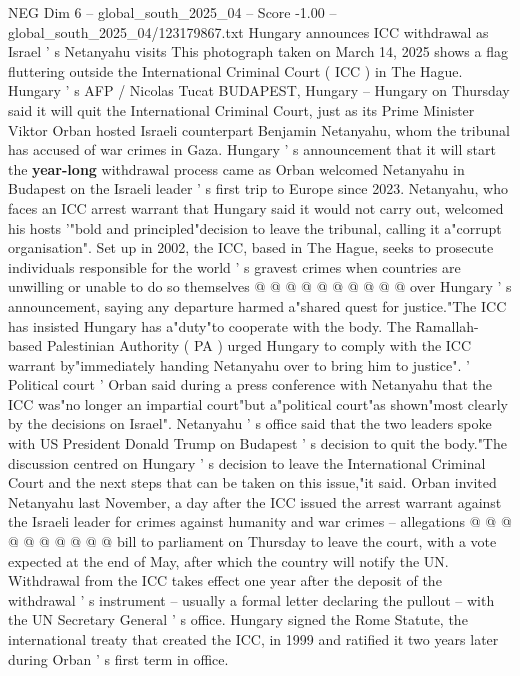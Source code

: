 \begin{textsample}{NEG Dim 6 – global\_south\_2025\_04 – Score -1.00 – global\_south\_2025\_04/123179867.txt}  \label{ex:f6_neg_206}
Hungary announces ICC withdrawal as Israel ' s Netanyahu visits This photograph taken on March 14, 2025 shows a flag fluttering outside the International Criminal Court ( ICC ) in The Hague.
Hungary ' s AFP / Nicolas Tucat BUDAPEST, Hungary -- Hungary on Thursday said it will quit the International Criminal Court, just as its Prime Minister Viktor Orban hosted Israeli counterpart Benjamin Netanyahu, whom the tribunal has accused of war crimes in Gaza.
Hungary ' s announcement that it will start the \textbf{year-long} withdrawal process came as Orban welcomed Netanyahu in Budapest on the Israeli leader ' s first trip to Europe since 2023.
Netanyahu, who faces an ICC arrest warrant that Hungary said it would not carry out, welcomed his hosts '"bold and principled"decision to leave the tribunal, calling it a"corrupt organisation".
Set up in 2002, the ICC, based in The Hague, seeks to prosecute individuals responsible for the world ' s gravest crimes when countries are unwilling or unable to do so themselves @ @ @ @ @ @ @ @ @ @ over Hungary ' s announcement, saying any departure harmed a"shared quest for justice."The ICC has insisted Hungary has a"duty"to cooperate with the body.
The Ramallah-based Palestinian Authority ( PA ) urged Hungary to comply with the ICC warrant by"immediately handing Netanyahu over to bring him to justice". ' Political court ' Orban said during a press conference with Netanyahu that the ICC was"no longer an impartial court"but a"political court"as shown"most clearly by the decisions on Israel".
Netanyahu ' s office said that the two leaders spoke with US President Donald Trump on Budapest ' s decision to quit the body."The discussion centred on Hungary ' s decision to leave the International Criminal Court and the next steps that can be taken on this issue,"it said.
Orban invited Netanyahu last November, a day after the ICC issued the arrest warrant against the Israeli leader for crimes against humanity and war crimes -- allegations @ @ @ @ @ @ @ @ @ @ bill to parliament on Thursday to leave the court, with a vote expected at the end of May, after which the country will notify the UN.
Withdrawal from the ICC takes effect one year after the deposit of the withdrawal ' s instrument -- usually a formal letter declaring the pullout -- with the UN Secretary General ' s office.
Hungary signed the Rome Statute, the international treaty that created the ICC, in 1999 and ratified it two years later during Orban ' s first term in office.

\end{textsample}
